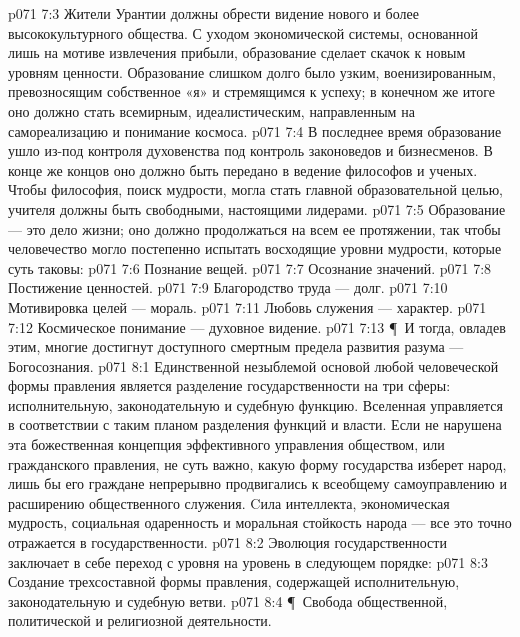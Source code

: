 \vs p071 7:3 Жители Урантии должны обрести видение нового и более высококультурного общества. С уходом экономической системы, основанной лишь на мотиве извлечения прибыли, образование сделает скачок к новым уровням ценности. Образование слишком долго было узким, военизированным, превозносящим собственное «я» и стремящимся к успеху; в конечном же итоге оно должно стать всемирным, идеалистическим, направленным на самореализацию и понимание космоса.
\vs p071 7:4 В последнее время образование ушло из\hyp{}под контроля духовенства под контроль законоведов и бизнесменов. В конце же концов оно должно быть передано в ведение философов и ученых. Чтобы философия, поиск мудрости, могла стать главной образовательной целью, учителя должны быть свободными, настоящими лидерами.
\vs p071 7:5 Образование --- это дело жизни; оно должно продолжаться на всем ее протяжении, так чтобы человечество могло постепенно испытать восходящие уровни мудрости, которые суть таковы:
\vs p071 7:6 \bibnobreakspace Познание вещей.
\vs p071 7:7 \bibnobreakspace Осознание значений.
\vs p071 7:8 \bibnobreakspace Постижение ценностей.
\vs p071 7:9 \bibnobreakspace Благородство труда --- долг.
\vs p071 7:10 \bibnobreakspace Мотивировка целей --- мораль.
\vs p071 7:11 \bibnobreakspace Любовь служения --- характер.
\vs p071 7:12 \bibnobreakspace Космическое понимание --- духовное видение.
\vs p071 7:13 \P\ И тогда, овладев этим, многие достигнут доступного смертным предела развития разума --- Богосознания.
\vs p071 8:1 Единственной незыблемой основой любой человеческой формы правления является разделение государственности на три сферы: исполнительную, законодательную и судебную функцию. Вселенная управляется в соответствии с таким планом разделения функций и власти. Если не нарушена эта божественная концепция эффективного управления обществом, или гражданского правления, не суть важно, какую форму государства изберет народ, лишь бы его граждане непрерывно продвигались к всеобщему самоуправлению и расширению общественного служения. Cила интеллекта, экономическая мудрость, социальная одаренность и моральная стойкость народа --- все это точно отражается в государственности.
\vs p071 8:2 Эволюция государственности заключает в себе переход с уровня на уровень в следующем порядке:
\vs p071 8:3 \bibnobreakspace Создание трехсоставной формы правления, содержащей исполнительную, законодательную и судебную ветви.
\vs p071 8:4 \P\ \bibnobreakspace Свобода общественной, политической и религиозной деятельности.
